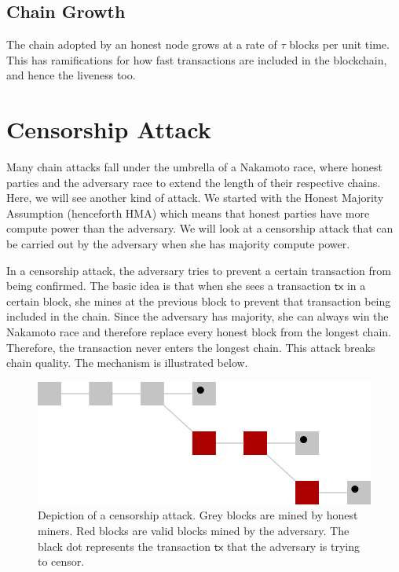 \subsection{Chain Growth}
The chain adopted by an honest node grows at a rate of $\tau$ blocks per unit time. This has ramifications for how fast transactions are included in the blockchain, and hence the liveness too.
\section{Censorship Attack}
Many chain attacks fall under the umbrella of a Nakamoto race, where honest parties and the adversary race to extend the length of their respective chains. Here, we will see another kind of attack. We started with the Honest Majority Assumption (henceforth HMA) which means that honest parties have more compute power than the adversary. We will look at a censorship attack that can be carried out by the adversary when she has majority compute power.

In a censorship attack, the adversary tries to prevent a certain transaction from being confirmed. The basic idea is that when she sees a transaction $\mathsf{tx}$ in a certain block, she mines at the previous block to prevent that transaction being included in the chain.
Since the adversary has majority, she can always win the Nakamoto race and therefore replace every honest block from the longest chain.
Therefore, the transaction never enters the longest chain.
This attack breaks chain quality.
The mechanism is illustrated below.


 \begin{figure}[h!]

\includegraphics[scale=0.5]{figures/censorship.png}
 \caption{Depiction of a censorship attack. Grey blocks are mined by honest miners. Red blocks are valid blocks mined by the adversary. The black dot represents the transaction $\mathsf{tx}$ that the adversary is trying to censor. }
\end{figure}


